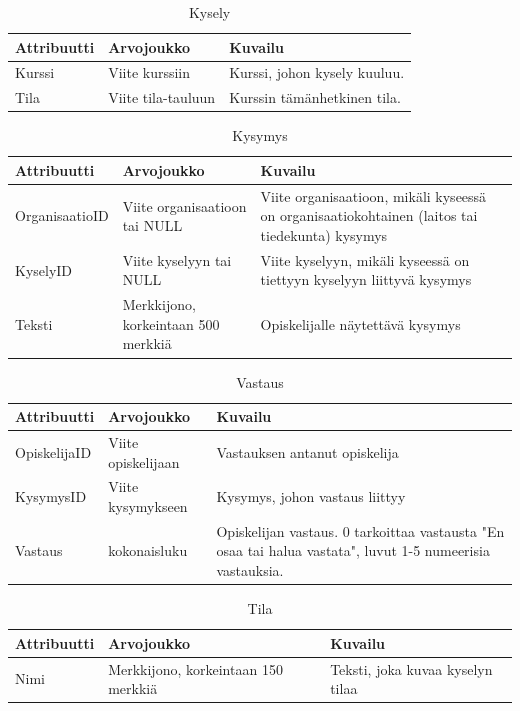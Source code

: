 \documentclass[12pt,a4paper,titlepage]{article}
\begin{document}
\begin{table}[h!]
\caption{Kysely}
\begin{tabularx}{\textwidth}{ |  l X X  |}
  \hline
  Attribuutti & Arvojoukko & Kuvailu \\
  \hline
  Kurssi & Viite kurssiin & Kurssi, johon kysely kuuluu. \\
  Tila & Viite tila-tauluun & Kurssin tämänhetkinen tila. \\
  \hline
\end{tabularx}
\end{table}

\begin{table}[h!]
\caption{Kysymys}
\begin{tabularx}{\textwidth}{ |  l X X  |}
  \hline
  Attribuutti & Arvojoukko & Kuvailu \\
  \hline
  OrganisaatioID & Viite organisaatioon tai NULL & Viite organisaatioon, mikäli kyseessä on organisaatiokohtainen (laitos tai tiedekunta) kysymys \\
  KyselyID & Viite kyselyyn tai NULL & Viite kyselyyn, mikäli kyseessä on tiettyyn kyselyyn liittyvä kysymys \\
  Teksti & Merkkijono, korkeintaan 500 merkkiä & Opiskelijalle näytettävä kysymys \\
  \hline
\end{tabularx}
\end{table}

\begin{table}[h!]
\caption{Vastaus}
\begin{tabularx}{\textwidth}{ |  l X X  |}
  \hline
  Attribuutti & Arvojoukko & Kuvailu \\
  \hline
  OpiskelijaID & Viite opiskelijaan & Vastauksen antanut opiskelija \\
  KysymysID & Viite kysymykseen & Kysymys, johon vastaus liittyy \\
  Vastaus & kokonaisluku & Opiskelijan vastaus. 0 tarkoittaa vastausta "En osaa tai halua vastata", luvut 1-5 numeerisia vastauksia. \\
  \hline
\end{tabularx}
\end{table}

\begin{table}[h!]
\caption{Tila} \label{tietokohde_viimeinen}
\begin{tabularx}{\textwidth}{ |  l X X  |}
  \hline
  Attribuutti & Arvojoukko & Kuvailu \\
  \hline
  Nimi & Merkkijono, korkeintaan 150 merkkiä & Teksti, joka kuvaa kyselyn tilaa\\
  \hline
\end{tabularx}
\end{table}
\end{document}

